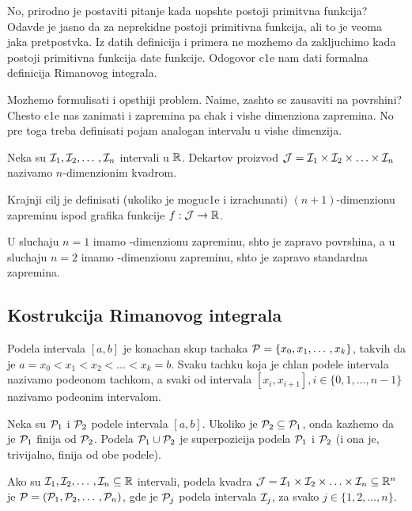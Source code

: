 \documentclass[../main.tex]{subfiles}
\begin{document}
    No, prirodno je postaviti pitanje kada uopshte postoji primitvna funkcija? Odavde je jasno da za neprekidne postoji primitivna funkcija, ali to je veoma
    jaka pretpostvka. Iz datih definicija i primera ne mozhemo da zakljuchimo kada postoji primitivna funkcija date funkcije. Odogovor c1e nam dati formalna definicija
    Rimanovog integrala.

    Mozhemo formulisati i opsthiji problem. Naime, zashto se zausaviti na povrshini? Chesto c1e nas zanimati i zapremina pa chak i vishe dimenziona zapremina. No pre toga
    treba definisati pojam analogan intervalu u vishe dimenzija.

    \begin{de}
    	Neka su $\mathcal{I}_1,\mathcal{I}_2,\dotso,\mathcal{I}_n$ intervali u $\mathbb{R}$. Dekartov proizvod $\mathcal{J}=\mathcal{I}_1 \times \mathcal{I}_2 \times \dotso \times \mathcal{I}_n$ nazivamo 
	$n$-dimenzionim	kvadrom.
    \end{de}

    Krajnji cilj je definisati (ukoliko je moguc1e i izrachunati) $(n+1)$-dimenzionu zapreminu ispod grafika funkcije $f:\mathcal{J} \to \mathbb{R}$.

    U sluchaju $n=1$ imamo -dimenzionu zapreminu\zng, shto je zapravo povrshina, a u sluchaju $n=2$ imamo -dimenzionu zapreminu\zng, shto je zapravo 
    standardna zapremina.

\subsection{Kostrukcija Rimanovog integrala}

    \begin{de}
    	Podela intervala $[a,b]$ je konachan skup tachaka $\mathcal{P}=\{x_0,x_1,\dotso,x_k\}$, takvih da je $a=x_0<x_1<x_2<\dotso<x_k=b$. Svaku tachku koja je chlan podele
	intervala nazivamo podeonom tachkom, a svaki od intervala $[x_i,x_{i+1}],i\in\{0,1,\dotso,n-1\}$ nazivamo podeonim intervalom.
    \end{de}

    Neka su $\mathcal{P}_1$ i $\mathcal{P}_2$ podele intervala $[a,b]$. Ukoliko je $\mathcal{P}_2\subseteq \mathcal{P}_1$, onda kazhemo da je $\mathcal{P}_1$ finija od $\mathcal{P}_2$. Podela 
    $\mathcal{P}_1\cup \mathcal{P}_2$ je superpozicija podela $\mathcal{P}_1$ i $\mathcal{P}_2$ (i ona je, trivijalno, finija od obe podele).

    Ako su $\mathcal{I}_1,\mathcal{I}_2,\dotso,\mathcal{I}_n\subseteq \mathbb{R}$ intervali, podela kvadra $\mathcal{J}=\mathcal{I}_1 \times \mathcal{I}_2 \times \dotso \times \mathcal{I}_n\subseteq \mathbb{R}^n$ je
    $\mathcal{P}=(\mathcal{P}_1,\mathcal{P}_2,\dotso, \mathcal{P}_n)$, gde je $\mathcal{P}_j$ podela intervala $\mathcal{I}_j$, za svako $j\in \{1,2,\dotso,n\}$.
\end{document}
